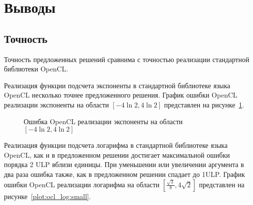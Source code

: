 \section{Выводы}

\subsection{Точность}

Точность предложенных решений сравнима с точностью реализации стандартной библиотеки OpenCL.

Реализация функции подсчета экспоненты в стандартной библиотеке языка OpenCL несколько точнее предложенного решения.
График ошибки OpenCL реализации экспоненты на области $[-4\ln{2}, 4\ln{2}]$ представлен на рисунке~\ref{plot:ocl_exp:small}.


\begin{figure}[hbt]
  \centering
  \caption{Ошибка OpenCL реализации экспоненты на области $[-4\ln{2}, 4\ln{2}]$}
  \label{plot:ocl_exp:small}
\end{figure}

Реализация функции подсчета логарифма в стандартной библиотеке языка OpenCL, как и в предложенном решении достигает максимальной ошибки порядка 2 ULP вблизи единицы.
При уменьшении или увеличении аргумента в два раза ошибка также, как в предложенном решении спадает до 1ULP.
График ошибки OpenCL реализации логарифма на области $[\frac{\sqrt{2}}{8}, 4\sqrt{2}]$ представлен на рисунке~\ref{plot:ocl_log:small}.


